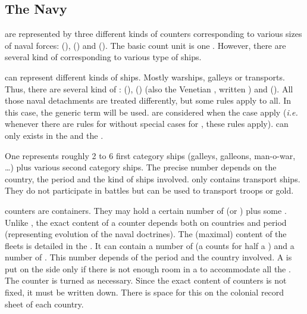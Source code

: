 \subsection{The Navy}

 are represented by three different kinds of counters
corresponding to various sizes of naval forces: 
(\ND),  (\FLEET) and 
(\NDE).
\bparag The basic count unit is one \ND. However, there are several kind of
\ND corresponding to various type of ships.

 \ND can represent different kinds of
ships. Mostly warships, galleys or transports.
\bparag Thus, there are several kind of \ND: 
(\NWD),  (\NGD) (also the Venetian
, written \VGD) and  (\NTD).
\bparag All those naval detachments are treated differently, but some rules
apply to all. In this case, the generic term \ND will be used.
\bparag \VGD are considered \NGD when the case apply (\emph{i.e.} whenever
there are rules for \NGD without special cases for \VGD, these rules apply).
\bparag \NGD can only exists in the \regionMediterrannee and the
\regionBaltique.

\aparag[Detachments.] One \ND represents roughly 2 to 6 first category ships
(galleys, galleons, man-o-war, \ldots) plus various second category ships. The
precise number depends on the country, the period and the kind of ships
involved.
\bparag \NTD only contains transport ships. They do not participate in battles
but can be used to transport troops or gold.

\aparag[Fleets.] \FLEET counters are containers. They may hold a certain
number of \NWD (or \NGD) plus some \NTD.
\bparag Unlike \ARMY, the exact content of a \FLEET counter depends both on
countries and period (representing evolution of the naval doctrines).
\bparag The (maximal) content of the fleets is detailed in the
. It can contain a number of \NWD (a
\NGD counts for half a \NWD) and a number of \NTD. This number depends of the
period and the country involved.
\bparag A \FLEET is put on the side \Faceplus only if there is not enough room
in a \FLEET\facemoins to accommodate all the \ND. The counter is turned as
necessary.
\bparag Since the exact content of \FLEET counters is not fixed, it must be
written down. There is space for this on the colonial record sheet of each
country.

